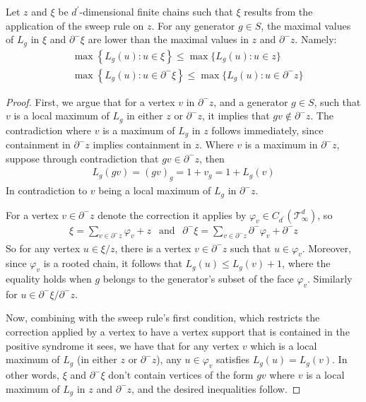 \begin{claim}
  \label{claim:edge_pole}
Let $z$ and $\xi$ be $d^{\prime}$-dimensional finite chains such that $\xi$ results from the application of the sweep rule on $z$.
For any generator $g \in S$, the maximal values of $L_{g}$ in $\xi$ and $\partial^{-} \xi$ are lower than the maximal values in $z$ and $\partial^{-} z$. Namely:
\begin{equation*}
  \begin{split}
    & \max \left\{ L_{g}(u) : u \in \xi \right\}  \le  \max \big\{ L_{g}(u) : u \in z \big\} \\
    & \max \left\{ L_{g}(u) : u \in \partial^{-} \xi \right\}  \le  \max \big\{ L_{g}(u) : u \in \partial^{-} z \big\} 
  \end{split}
\end{equation*}

\end{claim}
\begin{proof}
  First, we argue that for a vertex $v$ in $\partial^{-} z$, and a generator $g \in S$, such that $v$ is a local maximum of $L_{g}$ in either $z$ or $\partial^{-} z$, it implies that $gv \notin \partial^{-} z$. The contradiction where $v$ is a maximum of $L_{g}$ in $z$ follows immediately, since containment in $\partial^{-} z$ implies containment in $z$. Where $v$ is a maximum in $\partial^{-} z$, suppose through contradiction that $gv \in \partial^{-} z$, then
  \begin{equation*}
    \begin{split}
      L_{g}(gv) = (gv)_{g} = 1 + v_{g} = 1 + L_{g}(v)
    \end{split}
  \end{equation*}
In contradiction to $v$ being a local maximum of $L_{g}$ in $\partial^{-} z$.

For a vertex $v \in \partial^{-}z$ denote the correction it applies by $\varphi_{v} \in C_{d^{\prime}}(\mathcal T_\infty^d) $, so 
\begin{equation*}
  \begin{split}
    \xi = \sum_{v \in \partial^{-}z}\varphi_{v} + z \ \ \text{ and } \ \ \partial^{-}\xi = \sum_{v \in \partial^{-}z}\partial^{-}\varphi_{v} + \partial^{-}z
  \end{split}
\end{equation*}
So for any vertex $u \in \xi/z$, there is a vertex $v \in \partial^{-}z$ such that $u \in \varphi_{v}$. Moreover, since $\varphi_{v}$ is a rooted chain, it follows that $L_{g}(u) \le L_{g}(v) + 1$, where the equality holds when $g$ belongs to the generator's subset of the face $\varphi_{v}$. Similarly for $u \in \partial^{-}\xi/\partial^{-}z$. 

Now, combining with the sweep rule's first condition, which restricts the correction applied by a vertex to have a vertex support that is contained in the positive syndrome it sees, we have that for any vertex $v$ which is a local maximum of $L_{g}$ (in either $z$ or $\partial^{-}z$), any $u \in \varphi_{v}$ satisfies $L_{g}(u) = L_{g}(v)$. In other words, $\xi$ and $\partial^{-}\xi$ don't contain vertices of the form $gv$ where $v$ is a local maximum of $L_{g}$ in $z$ and $\partial^{-}z$, and the desired inequalities follow.
\end{proof}
